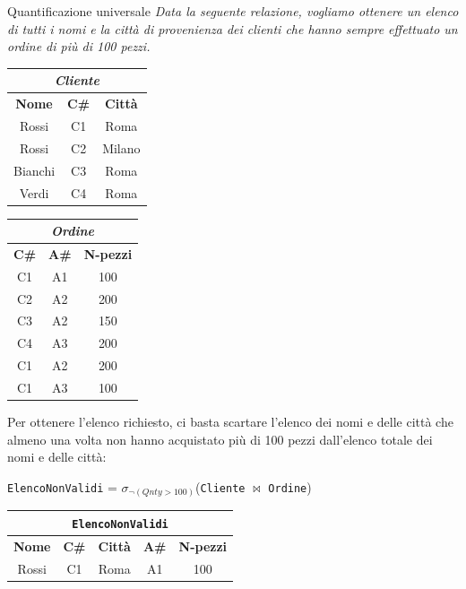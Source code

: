 \begin{Example}{Quantificazione universale}{}
    \textit{Data la seguente relazione, vogliamo ottenere un elenco di tutti i nomi e la città di provenienza dei clienti che hanno sempre effettuato un ordine di più di 100 pezzi.}
    \begin{center}
        \begin{tabular}{|c|c|c|}
            \hline\multicolumn{3}{|c|}{\textit{Cliente}}\\\hline
            \textbf{Nome} & \textbf{C\#} & \textbf{Città}\\\hline
            Rossi & C1 & Roma\\
            Rossi & C2 & Milano\\
            Bianchi & C3 & Roma\\
            Verdi & C4 & Roma\\\hline
        \end{tabular}
        \begin{tabular}{|c|c|c|}
            \hline\multicolumn{3}{|c|}{\textit{Ordine}}\\\hline
            \textbf{C\#} & \textbf{A\#} & \textbf{N-pezzi}\\\hline
            C1 & A1 & 100\\
            C2 & A2 & 200\\
            C3 & A2 & 150\\
            C4 & A3 & 200\\
            C1 & A2 & 200\\
            C1 & A3 & 100\\\hline
        \end{tabular}
    \end{center}
    Per ottenere l'elenco richiesto, ci basta scartare l'elenco dei nomi e delle città che almeno una volta non hanno acquistato più di 100 pezzi dall'elenco totale dei nomi e delle città:
    \begin{center}
        \verb|ElencoNonValidi| = $\sigma_{\lnot(Qnty>100)}$(\verb|Cliente| $\bowtie$ \verb|Ordine|)
    \end{center}
    \begin{center}
         \begin{tabular}{|c|c|c|c|c|}
            \hline\multicolumn{5}{|c|}{\Verb|ElencoNonValidi|}\\\hline
            \textbf{Nome} & \textbf{C\#} & \textbf{Città} & \textbf{A\#} & \textbf{N-pezzi}\\\hline
            Rossi & C1 & Roma & A1 & 100\\

\end{tabular}
\end{center}
\end{Example}
